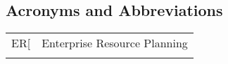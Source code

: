 \begin{center}
\section*{Acronyms and Abbreviations}
\end{center}


\begin{tabular}{p{3cm}p{11cm}}
ER[ & Enterprise Resource Planning \\
\\
\end{tabular}
